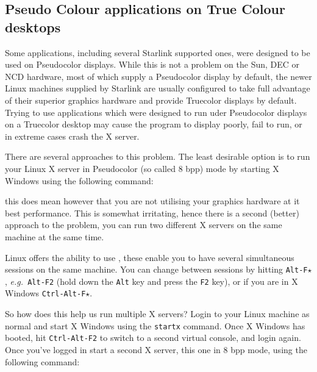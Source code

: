 \documentclass[twoside,11pt]{starlink}
\begin{document}
\subsection{Pseudo Colour applications on
True Colour desktops\label{sc15_pseudoontrue}}

Some applications, including several Starlink supported ones, were
designed to be used on Pseudocolor displays. While this is not a
problem on the Sun, DEC or NCD hardware, most of which supply a
Pseudocolor display by default, the newer Linux machines supplied by
Starlink are usually configured to take full advantage of their
superior graphics hardware and provide Truecolor displays by default.
Trying to use applications which were designed to run uder Pseudocolor
displays on a Truecolor desktop may cause the program to display
poorly, fail to run, or in extreme cases crash the X server.

There are several approaches to this problem. The least desirable
option is to run your Linux X server in Pseudocolor (so called 8 bpp)
mode by starting X Windows using the following command:

\begin{terminalv}
\end{terminalv}

this does mean however that you are not utilising your graphics
hardware at it best performance. This is somewhat irritating, hence
there is a second (better) approach to the problem, you can run two
different X servers on the same machine at the same time.

Linux offers the ability to use ,
these enable you to have several simultaneous sessions on the same
machine. You can change between sessions by hitting \texttt{Alt-F$\star$}, \emph{e.g.\ }\texttt{Alt-F2} (hold down the \texttt{Alt} key
and press the \texttt{F2} key), or if you are in X Windows \texttt{Ctrl-Alt-F$\star$}.

So how does this help us run multiple X servers? Login to your Linux
machine as normal and start X Windows using the \texttt{startx} command.
Once X Windows has booted, hit \texttt{Ctrl-Alt-F2} to switch to a second
virtual console, and login again. Once you've logged in start a second
X server, this one in 8 bpp mode, using the following command:

\begin{terminalv}
\end{terminalv}
\end{document}
